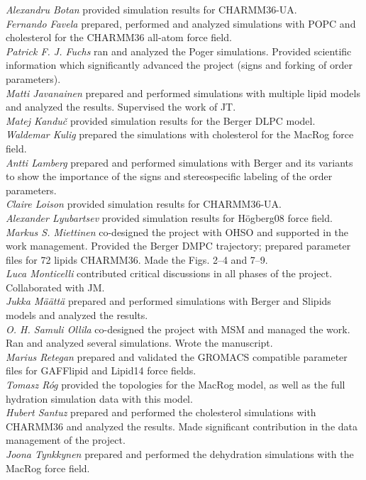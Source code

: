 \documentclass[journal=jacsat,manuscript=article]{achemso}
\begin{document}
{\it Alexandru Botan} provided simulation results for CHARMM36-UA.\\[0.7ex]
{\it Fernando Favela} prepared, performed and analyzed simulations
with POPC and cholesterol for the CHARMM36 all-atom force field. \\[0.7ex]
{\it Patrick F. J. Fuchs} ran and analyzed the Poger simulations. Provided scientific information which significantly advanced the project (signs and forking of order parameters). \\[0.7ex]
{\it Matti Javanainen} prepared and performed simulations with multiple lipid models and analyzed the results. Supervised the work of JT.\\[0.7ex]
{\it Matej Kandu\v{c}} provided simulation results for the Berger DLPC model. \\[0.7ex]
{\it Waldemar Kulig} prepared the simulations with cholesterol for the MacRog force field. \\[0.7ex]
{\it Antti Lamberg} prepared and performed simulations with Berger and its variants to show the importance of the signs and stereospecific labeling of the order parameters. \\[0.7ex]
{\it Claire Loison} provided simulation results for CHARMM36-UA. \\
{\it Alexander Lyubartsev} provided simulation results for H\"ogberg08 force field.\\[0.7ex]
{\it Markus S. Miettinen} co-designed the project with OHSO and supported in the work management. Provided the Berger DMPC trajectory; prepared parameter files for 72 lipids %
CHARMM36. Made the Figs. 2--4 and 7--9.\\[0.7ex]
{\it Luca Monticelli} contributed critical discussions in all phases of the project. Collaborated with JM. \\[0.7ex]
{\it Jukka M{\"a}{\"a}tt{\"a}}  prepared and performed simulations with Berger and Slipids models and analyzed the results.\\[0.7ex]
{\it O. H. Samuli Ollila} co-designed the project with MSM and managed the work. Ran and analyzed several simulations. Wrote the manuscript. \\[0.7ex]
{\it Marius Retegan} prepared and validated the GROMACS compatible parameter files for GAFFlipid and Lipid14 force fields.\\[0.7ex]
{\it Tomasz R\'og} provided the topologies for the MacRog model, as well as the full hydration simulation data with this model. \\[0.7ex]
{\it Hubert Santuz} prepared and performed the cholesterol simulations with CHARMM36 and analyzed the results. 
Made significant contribution in the data management of the project.\\[0.7ex]
{\it Joona Tynkkynen} prepared and performed the dehydration simulations with the MacRog force field.\\


\newpage


\end{document}

